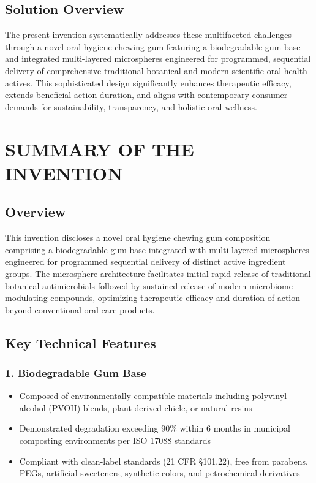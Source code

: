 \documentclass[12pt]{article}
\begin{document}
\subsection*{Solution Overview}
The present invention systematically addresses these multifaceted challenges through a novel oral hygiene chewing gum featuring a biodegradable gum base and integrated multi-layered microspheres engineered for programmed, sequential delivery of comprehensive traditional botanical and modern scientific oral health actives. This sophisticated design significantly enhances therapeutic efficacy, extends beneficial action duration, and aligns with contemporary consumer demands for sustainability, transparency, and holistic oral wellness.

\section*{SUMMARY OF THE INVENTION}

\subsection*{Overview}
This invention discloses a novel oral hygiene chewing gum composition comprising a biodegradable gum base integrated with multi-layered microspheres engineered for programmed sequential delivery of distinct active ingredient groups. The microsphere architecture facilitates initial rapid release of traditional botanical antimicrobials followed by sustained release of modern microbiome-modulating compounds, optimizing therapeutic efficacy and duration of action beyond conventional oral care products.

\subsection*{Key Technical Features}

\subsubsection*{1. Biodegradable Gum Base}
\begin{itemize}
    \item Composed of environmentally compatible materials including polyvinyl alcohol (PVOH) blends, plant-derived chicle, or natural resins
    \item Demonstrated degradation exceeding 90\% within 6 months in municipal composting environments per ISO 17088 standards
    \item Compliant with clean-label standards (21 CFR §101.22), free from parabens, PEGs, artificial sweeteners, synthetic colors, and petrochemical derivatives
\end{itemize}
\end{document}
